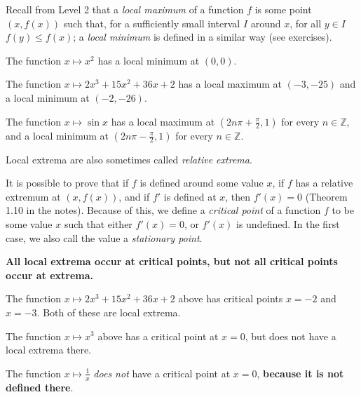 


Recall from Level 2 that a \textit{local maximum} of a function $ f $ is some point $ (x, f(x)) $
such that, for a sufficiently small interval $ I $ around $ x $, for all $ y \in I $ $ f(y) \leq f(x) $;
a \textit{local minimum} is defined in a similar way (see exercises).

\begin{ex}
  The function $ x \mapsto x^2 $ has a local minimum at $ (0, 0) $.
\end{ex}
\begin{ex}
  The function $ x \mapsto 2x^3 + 15x^2 + 36x + 2 $ has a local maximum at $ (-3, -25) $ and a local minimum at $ (-2, -26) $.
\end{ex}
\begin{ex}
  The function $ x \mapsto \sin x $ has a local maximum at $ (2n\pi + \frac{\pi}{2}, 1) $ for every $ n \in \mathbb{Z} $, and
  a local minimum at $ (2n\pi - \frac{\pi}{2}, 1) $ for every $ n \in \mathbb{Z} $.
\end{ex}

Local extrema are also sometimes called \textit{relative extrema}.

It is possible to prove that if $ f $ is defined around some value $ x $, if $ f $ has a relative extremum at $ (x, f(x)) $, and
if $ f' $ is defined at $ x $, then $ f'(x) = 0 $ (Theorem 1.10 in the notes). Because of this, we define a \textit{critical point}
of a function $ f $ to be some value $ x $ such that either $ f'(x) = 0 $, or $ f'(x) $ is undefined. In the first case, we also
call the value a \textit{stationary point}.

\textbf{All local extrema occur at critical points, but not all critical points occur at extrema.}

\begin{ex}
  The function $ x \mapsto 2x^3 + 15x^2 + 36x + 2 $ above has critical points $ x = -2 $ and $ x = -3 $. Both of
  these are local extrema.
\end{ex}

\begin{ex}
  The function $ x \mapsto x^3 $ above has a critical point at $ x = 0 $, but does not have a local extrema there.
\end{ex}

\begin{ex}
  The function $ x \mapsto \frac{1}{x} $ \textit{does not} have a critical point at $ x = 0 $, \textbf{because it is not defined there}.
\end{ex}

